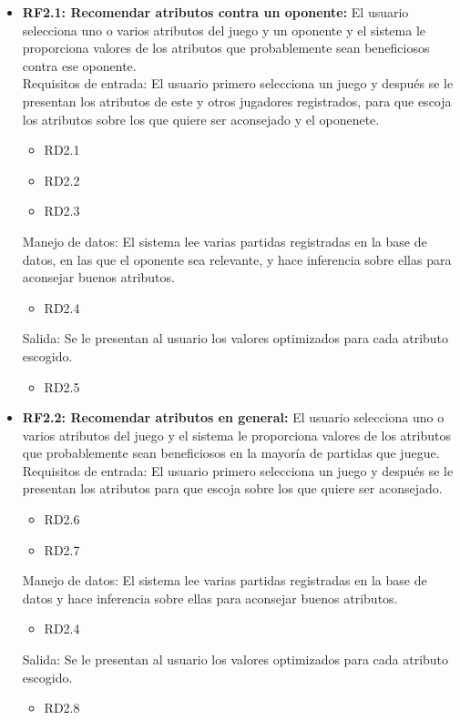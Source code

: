 	\begin{itemize}
		\item \textbf{RF2.1: Recomendar atributos contra un oponente:}
			El usuario selecciona uno o varios atributos del juego y un
			oponente y el sistema le proporciona valores de los
			atributos que probablemente sean beneficiosos contra ese oponente.\\

			Requisitos de entrada: El usuario primero selecciona un juego y
			después se le presentan los atributos de este y otros
			jugadores registrados, para que escoja los atributos sobre
			los que quiere ser aconsejado y el oponenete.
			\begin{itemize}
				\item RD2.1 %
				\item RD2.2 %
				\item RD2.3 %
			\end{itemize}
			Manejo de datos: El sistema lee varias partidas registradas
			en la base de datos, en las que el oponente sea relevante,
			y hace inferencia sobre ellas para aconsejar buenos atributos.
			\begin{itemize}
				\item RD2.4 %
			\end{itemize}
			Salida: Se le presentan al usuario los valores optimizados
			para cada atributo escogido.
			\begin{itemize}
				\item RD2.5 %
			\end{itemize}

		\item \textbf{RF2.2: Recomendar atributos en general:}
			El usuario selecciona uno o varios atributos del juego
			y el sistema le proporciona valores de los atributos
			que probablemente sean beneficiosos en la mayoría
			de partidas que juegue.\\

			Requisitos de entrada: El usuario primero selecciona un juego y
			después se le presentan los atributos para que escoja sobre
			los que quiere ser aconsejado.
			\begin{itemize}
				\item RD2.6 %
				\item RD2.7 %
			\end{itemize}
			Manejo de datos: El sistema lee varias partidas registradas
			en la base de datos y hace inferencia sobre ellas para
			aconsejar buenos atributos.
			\begin{itemize}
				\item RD2.4 %
			\end{itemize}
			Salida: Se le presentan al usuario los valores optimizados
			para cada atributo escogido.
			\begin{itemize}
				\item RD2.8 %
			\end{itemize}


\end{itemize}
